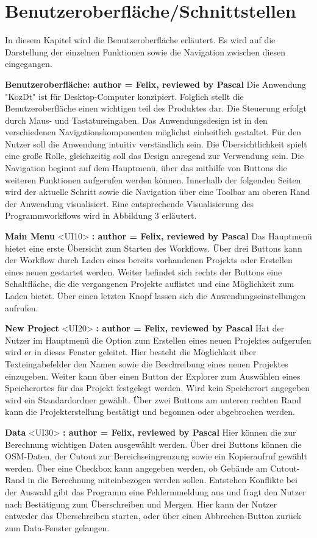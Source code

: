 \documentclass[parskip=full]{scrartcl} %
\begin{document}
\newpage



\section{Benutzeroberfläche/Schnittstellen}
In diesem Kapitel wird die Benutzeroberfläche erläutert. Es wird auf die Darstellung der einzelnen Funktionen sowie die Navigation zwischen diesen eingegangen.

\textbf{Benutzeroberfläche: author = Felix, reviewed by Pascal}
Die Anwendung "KozDt" ist für Desktop-Computer konzipiert. Folglich stellt die Benutzeroberfläche einen wichtigen teil des Produktes dar.
Die Steuerung erfolgt durch Maus- und Tastatureingaben. Das Anwendungsdesign ist in den verschiedenen Navigationskomponenten möglichst einheitlich gestaltet. Für den Nutzer soll die Anwendung intuitiv verständlich sein. Die Übersichtlichkeit spielt eine große Rolle, gleichzeitig soll das Design anregend zur Verwendung sein.
Die Navigation beginnt auf dem Hauptmenü, über das mithilfe von Buttons die weiteren Funktionen aufgerufen werden können.
Innerhalb der folgenden Seiten wird der aktuelle Schritt sowie die Navigation über eine Toolbar am oberen Rand der Anwendung visualisiert. 
Eine entsprechende Visualisierung des Programmworkflows wird in Abbildung 3 erläutert.

\textbf{Main Menu }<UI10>\textbf{ : author = Felix, reviewed by Pascal}
Das Hauptmenü bietet eine erste Übersicht zum Starten des Workflows. Über drei Buttons kann der Workflow durch Laden eines bereits vorhandenen Projekts oder Erstellen eines neuen gestartet werden. Weiter befindet sich rechts der Buttons eine Schaltfläche, die die vergangenen Projekte auflistet und eine Möglichkeit zum Laden bietet. Über einen letzten Knopf lassen sich die Anwendungseinstellungen aufrufen.

\textbf{New Project }<UI20>\textbf{ : author = Felix, reviewed by Pascal}
Hat der Nutzer im Hauptmenü die Option zum Erstellen eines neuen Projektes aufgerufen wird er in dieses Fenster geleitet.
Hier besteht die Möglichkeit über Texteingabefelder den Namen sowie die Beschreibung eines neuen Projektes einzugeben. Weiter kann über einen Button der Explorer zum Auswählen eines Speicherortes für das Projekt festgelegt werden. Wird kein Speicherort angegeben wird ein Standardordner gewählt.
Über zwei Buttons am unteren rechten Rand kann die Projekterstellung bestätigt und begonnen oder abgebrochen werden.

\textbf{Data }<UI30>\textbf{ : author = Felix, reviewed by Pascal}
Hier können die zur Berechnung wichtigen Daten ausgewählt werden.
Über drei Buttons können die OSM-Daten, der Cutout zur Bereichseingrenzung sowie ein Kopieraufruf gewählt werden. Über eine Checkbox kann angegeben werden, ob Gebäude am Cutout-Rand in die Berechnung miteinbezogen werden sollen.
Entstehen Konflikte bei der Auswahl gibt das Programm eine Fehlermmeldung aus und fragt den Nutzer nach Bestätigung zum Überschreiben und Mergen. Hier kann der Nutzer entweder das Überschreiben starten, oder über einen Abbrechen-Button zurück zum Data-Fenster gelangen.
\end{document}
